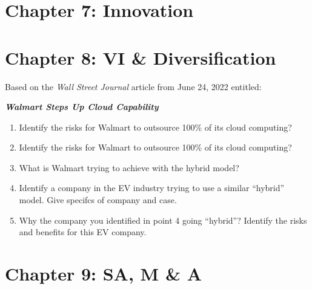 \documentclass[
]{book}
\providecommand{\tightlist}{%
  \setlength{\itemsep}{0pt}\setlength{\parskip}{0pt}}
\begin{document}
\hypertarget{chapter-7-innovation}{%
\chapter{Chapter 7: Innovation}\label{chapter-7-innovation}}

\hypertarget{chapter-8-vi-diversification}{%
\chapter{Chapter 8: VI \& Diversification}\label{chapter-8-vi-diversification}}

Based on the \emph{Wall Street Journal} article from June 24, 2022 entitled:

\textbf{\emph{Walmart Steps Up Cloud Capability}}

\begin{enumerate}
\def\labelenumi{\arabic{enumi}.}
\tightlist
\item
  Identify the risks for Walmart to outsource 100\% of its cloud computing?
\item
  Identify the risks for Walmart to outsource 100\% of its cloud computing?
\item
  What is Walmart trying to achieve with the hybrid model?
\item
  Identify a company in the EV industry trying to use a similar ``hybrid'' model. Give specifcs of company and case.
\item
  Why the company you identified in point 4 going ``hybrid''? Identify the risks and benefits for this EV company.
\end{enumerate}

\hypertarget{chapter-9-sa-m-a}{%
\chapter{Chapter 9: SA, M \& A}\label{chapter-9-sa-m-a}}

  
\end{document}
